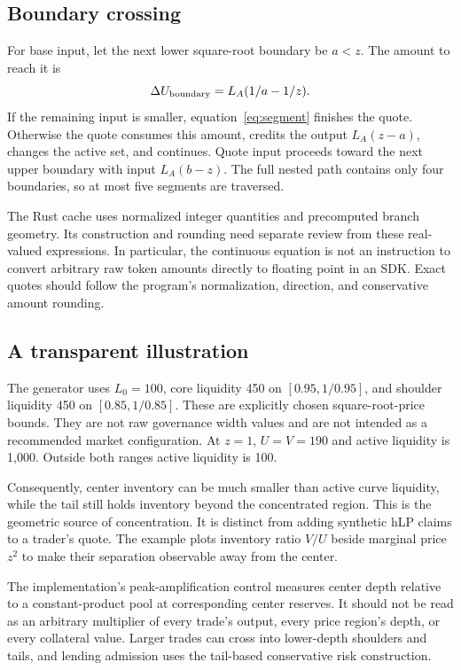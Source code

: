 \subsection{Boundary crossing}

For base input, let the next lower square-root boundary be $a<z$. The amount to reach it is
\[
\Delta U_{\rm boundary}=L_A(1/a-1/z).
\]
If the remaining input is smaller, equation~\eqref{eq:segment} finishes the quote. Otherwise the quote consumes this amount, credits the output $L_A(z-a)$, changes the active set, and continues. Quote input proceeds toward the next upper boundary with input $L_A(b-z)$. The full nested path contains only four boundaries, so at most five segments are traversed.

The Rust cache uses normalized integer quantities and precomputed branch geometry. Its construction and rounding need separate review from these real-valued expressions. In particular, the continuous equation is not an instruction to convert arbitrary raw token amounts directly to floating point in an SDK. Exact quotes should follow the program's normalization, direction, and conservative amount rounding.

\subsection{A transparent illustration}

The generator uses $L_0=100$, core liquidity 450 on $[0.95,1/0.95]$, and shoulder liquidity 450 on $[0.85,1/0.85]$. These are explicitly chosen square-root-price bounds. They are not raw governance width values and are not intended as a recommended market configuration. At $z=1$, $U=V=190$ and active liquidity is 1,000. Outside both ranges active liquidity is 100.

Consequently, center inventory can be much smaller than active curve liquidity, while the tail still holds inventory beyond the concentrated region. This is the geometric source of concentration. It is distinct from adding synthetic hLP claims to a trader's quote. The example plots inventory ratio $V/U$ beside marginal price $z^2$ to make their separation observable away from the center.

The implementation's peak-amplification control measures center depth relative to a constant-product pool at corresponding center reserves. It should not be read as an arbitrary multiplier of every trade's output, every price region's depth, or every collateral value. Larger trades can cross into lower-depth shoulders and tails, and lending admission uses the tail-based conservative risk construction.

